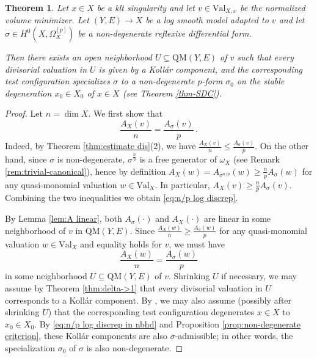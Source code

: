 \documentclass[12pt]{amsart}
\newtheorem{thm}[prop]{Theorem}
\theoremstyle{definition}
\newcommand{\Val}{\mathrm{Val}}
\newcommand{\QM}{\mathrm{QM}}
\numberwithin{equation}{section}
\begin{document}
\begin{thm} \label{thm:sigma-admissible nbhd}
Let $x\in X$ be a klt singularity and let $v\in \Val_{X,x}$ be the normalized
volume minimizer. Let $(Y,E)\to X$ be a log smooth model adapted to $v$ and let $\sigma\in H^0(X,\Omega_X^{[p]})$ be a non-degenerate reflexive
differential form. 

Then there exists an open neighborhood $U\subseteq \QM(Y,E)$ of $v$ such that every divisorial valuation in $U$ is given by a Koll\'ar component, and the corresponding test configuration specializes $\sigma$ to a non-degenerate $p$-form $\sigma_0$ on the stable degeneration $x_0\in X_0$ of $x\in X$ (see Theorem \ref{thm-SDC}).
\end{thm}

\begin{proof}
Let $n=\dim X$. We first show that
\begin{equation}\label{eq:n/p log discrep}
\frac{A_X(v)}{n}= \frac{A_{\sigma}(v)}{p}\, .
\end{equation}
Indeed, by Theorem \ref{thm:estimate dis}(2), we have $\frac{A_X(v)}{n}\le \frac{A_{\sigma}(v)}{p}$. On the other hand, since $\sigma$ is non-degenerate, $\sigma^{\frac{n}{p}}$ is a free generator of $\omega_X$ (see Remark \ref{rem:trivial-canonical}), hence by definition $A_X(w) = A_{\sigma^{n/p}}(w) \ge \frac{n}{p} A_\sigma(w)$ for any quasi-monomial valuation $w\in \Val_{X}$. In particular, $A_X(v) \ge \frac{n}{p} A_\sigma(v)$. Combining the two inequalities we obtain \eqref{eq:n/p log discrep}.

By Lemma \ref{lem:A linear}, both $A_\sigma(\cdot)$ and $A_X(\cdot)$ are linear in some neighborhood of $v$ in $\QM(Y,E)$. Since $\frac{A_X(w)}{n}\ge \frac{A_{\sigma}(w)}{p}$ for any quasi-monomial valuation $w\in \Val_X$ and equality holds for $v$, we must have
\begin{equation} \label{eq:n/p log discrep in nbhd}
\frac{A_X(w)}{n} = \frac{A_{\sigma}(w)}{p}
\end{equation}
in some neighborhood $U\subseteq \QM(Y,E)$ of $v$. Shrinking $U$ if necessary, we may assume by Theorem \ref{thm:delta->1} that every divisorial valuation in $U$ corresponds to a Koll\'ar component. By \cite[Lemma 2.10]{LX-higher-rank}, we may also assume (possibly after shrinking $U$) that the corresponding test configuration degenerates $x\in X$ to $x_0\in X_0$. By \eqref{eq:n/p log discrep in nbhd} and Proposition \ref{prop:non-degenerate criterion}, these Koll\'ar components are also $\sigma$-admissible; in other words, the specialization $\sigma_0$ of $\sigma$ is also non-degenerate.
\end{proof}
\end{document}
